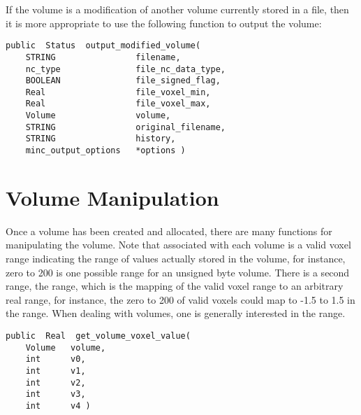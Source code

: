 
If the volume is a modification of another volume currently stored in
a file, then it is more appropriate to use the following function to
output the volume:

{\bf\begin{verbatim}
public  Status  output_modified_volume(
    STRING                filename,
    nc_type               file_nc_data_type,
    BOOLEAN               file_signed_flag,
    Real                  file_voxel_min,
    Real                  file_voxel_max,
    Volume                volume,
    STRING                original_filename,
    STRING                history,
    minc_output_options   *options )
\end{verbatim}}


\section{Volume Manipulation}

Once a volume has been created and allocated, there are many
functions for manipulating the volume.  Note that associated with
each volume is a valid voxel range indicating the range of values
actually stored in the volume, for instance, zero to 200 is one
possible range for an unsigned byte volume.  There is a second range,
the  range, which is the mapping of the valid voxel range
to an arbitrary real range, for instance, the zero to 200 of valid
voxels could map to -1.5 to 1.5 in the  range.  When
dealing with volumes, one is generally interested in the 
range.

{\bf\begin{verbatim}
public  Real  get_volume_voxel_value(
    Volume   volume,
    int      v0,
    int      v1,
    int      v2,
    int      v3,
    int      v4 )
\end{verbatim}}

